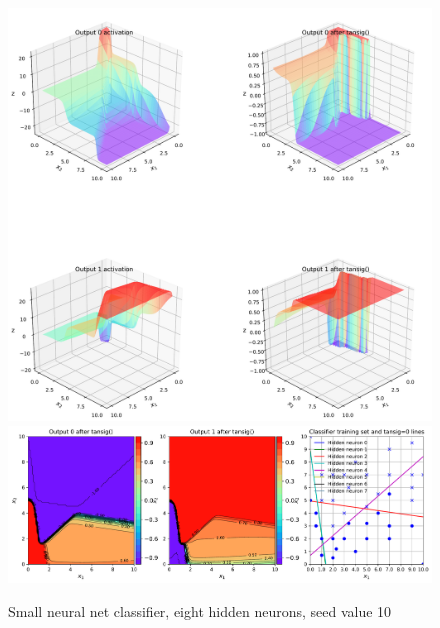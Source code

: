  
\begin{figure}[p]
\centering
\includegraphics[width=\textwidth]{pic/chC-classifa08}
\includegraphics[width=\textwidth]{pic/chC-classifb08}
\caption{Small neural net classifier, eight hidden neurons, seed value 10}
\label{fig:chC-classif08}
\end{figure}
 
